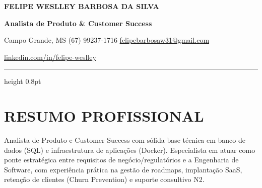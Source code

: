 \documentclass[10pt,a4paper]{article}
\begin{document}
\color{ink}
{\fontsize{19}{23}\selectfont\bfseries FELIPE WESLLEY BARBOSA DA SILVA}\par
{\large\bfseries\color{accent}Analista de Produto \& Customer Success}\par
{\small Campo Grande, MS \enspace\textbullet\enspace (67) 99237-1716 \enspace\textbullet\enspace \href{mailto:felipebarbosaw31@gmail.com}{felipebarbosaw31@gmail.com}\par
\href{https://linkedin.com/in/felipe-weslley}{linkedin.com/in/felipe-weslley}}\par
{\color{accent}\hrule height 0.8pt}
\section*{RESUMO PROFISSIONAL}
Analista de Produto e Customer Success com sólida base técnica em banco de dados (SQL) e infraestrutura de aplicações (Docker). Especialista em atuar como ponte estratégica entre requisitos de negócio/regulatórios e a Engenharia de Software, com experiência prática na gestão de roadmaps, implantação SaaS, retenção de clientes (Churn Prevention) e suporte consultivo N2.
\end{document}

